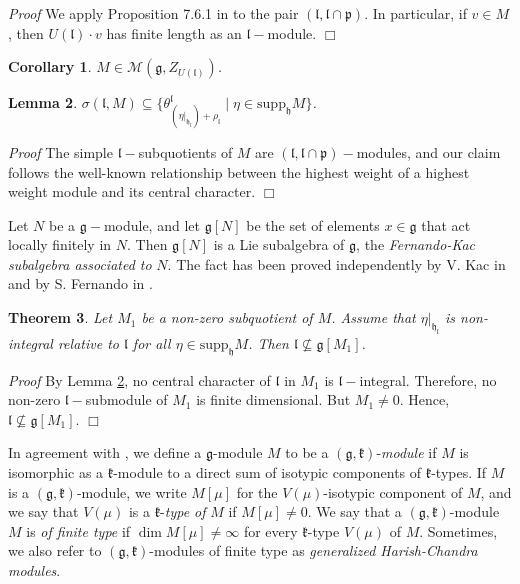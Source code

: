 \documentclass[10pt]{amsart}
\newtheorem{theo}{Theorem}[section]
\newtheorem{lem}[theo]{Lemma}
\newtheorem{cor}[theo]{Corollary}
\renewenvironment{proof}{ \emph{Proof}}{$\Box$}
\newcommand{\supp}{\mathrm{supp}}
\renewcommand{\gg}{\mathfrak{g}}
\newcommand{\hh}{\mathfrak{h}}
\newcommand{\kk}{\mathfrak{k}}
\renewcommand{\ll}{\mathfrak{l}}
\newcommand{\pp}{\mathfrak{p}}
\begin{document}
\begin{proof}
 We apply Proposition 7.6.1 in \cite{Dix} to the pair $(\ll, \ll\cap\pp)$. In particular, if $v \in M$, then $U(\ll) \cdot v$ has finite length as an $\ll-$module.
\end{proof}

\begin{cor}\label{corr:1}
 $M \in \mathcal{M}(\gg, Z_{U(\ll)})$.
\end{cor}

\begin{lem}\label{lemma:4}
  $\sigma(\ll,M) \subseteq \lbrace\theta_{(\eta|_{\hh_{\ll}})+\rho_{\ll}}^{\ll}\;|\;\eta \in \supp_{\hh}M\rbrace$. 
\end{lem}

\begin{proof}
The simple $\ll-$subquotients of $M$ are $(\ll,\ll\cap\pp)-$modules, and our claim follows the well-known relationship between the highest weight of a highest weight module and its central character.
\end{proof}
\vspace{0.5cm}

Let $N$ be a $\gg-$module, and let $\gg[N]$ be the set of elements $x \in \gg$ that act locally finitely in $N$. Then $\gg[N]$ is a Lie subalgebra of $\gg$, the \textit{Fernando-Kac subalgebra associated to} $N$. The fact has been proved independently by V. Kac in \cite{K} and by S. Fernando in \cite{F}.

\begin{theo}\label{th:1}
 Let $M_1$ be a non-zero subquotient of $M$. Assume that $\eta|_{\hh_{\ll}}$ is non-integral relative to $\ll$ for all $\eta \in \supp_{\hh}M$. Then $\ll \nsubseteq \gg[M_1]$.
\end{theo}

\begin{proof}
 By Lemma \ref{lemma:4}, no central character of $\ll$ in $M_1$ is $\ll-$integral. Therefore, no non-zero $\ll-$submodule of $M_1$ is finite dimensional. But $M_1 \neq 0$. Hence, $\ll \nsubseteq \gg[M_1]$.
\end{proof}

\vspace{0.5cm}

In agreement with \cite{PZ2}, we define a $\gg$-module $M$ to be a $(\gg,\kk)$-\textit{module} if $M$ is isomorphic as a $\kk$-module to a direct sum of isotypic components of $\kk$-types. If $M$ is a $(\gg,\kk)$-module, we write $M[\mu]$ for the $V(\mu)$-isotypic component of $M$, and we say that $V(\mu)$ is a $\kk$-\textit{type of} $M$ if $M[\mu]\neq 0$. We say that a $(\gg,\kk)$-module $M$ is \textit{of finite type} if $\dim M[\mu]\neq\infty$ for every $\kk$-type $V(\mu)$ of $M$. Sometimes, we also refer to $(\gg,\kk)$-modules of finite type as \textit{generalized Harish-Chandra modules}.
\end{document}
